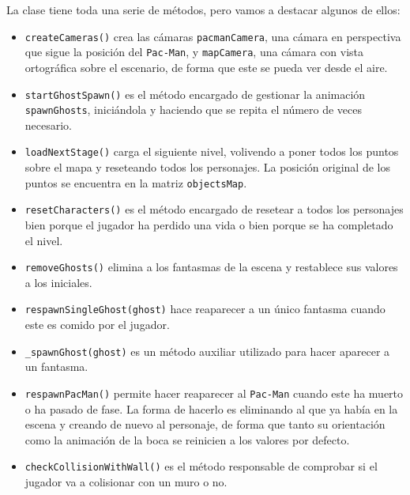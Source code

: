 \documentclass[11pt,a4paper]{article}
\begin{document}
La clase tiene toda una serie de métodos, pero vamos a destacar algunos de ellos:

\begin{itemize}
	\item \texttt{createCameras()} crea las cámaras \texttt{pacmanCamera}, una cámara en
	perspectiva que sigue la posición del \texttt{Pac-Man}, y \texttt{mapCamera}, una cámara
	con vista ortográfica sobre el escenario, de forma que este se pueda ver desde el aire.
	
	\item \texttt{startGhostSpawn()} es el método encargado de gestionar la animación
	\texttt{spawnGhosts}, iniciándola y haciendo que se repita el número de veces necesario.
	
	\item \texttt{loadNextStage()} carga el siguiente nivel, volivendo a poner todos los
	puntos sobre el mapa y reseteando todos los personajes. La posición original de los puntos
	se encuentra en la matriz \texttt{objectsMap}.
	
	\item \texttt{resetCharacters()} es el método encargado de resetear a todos los personajes
	bien porque el jugador ha perdido una vida o bien porque se ha completado el nivel.
	
	\item \texttt{removeGhosts()} elimina a los fantasmas de la escena y restablece sus
	valores a los iniciales.
	
	\item \texttt{respawnSingleGhost(ghost)} hace reaparecer a un único fantasma cuando este
	es comido por el jugador.
	
	\item \texttt{\_spawnGhost(ghost)} es un método auxiliar utilizado para hacer aparecer a un
	fantasma.
	
	\item \texttt{respawnPacMan()} permite hacer reaparecer al \texttt{Pac-Man} cuando este
	ha muerto o ha pasado de fase. La forma de hacerlo es eliminando al que ya había en la
	escena y creando de nuevo al personaje, de forma que tanto su orientación como la animación
	de la boca se reinicien a los valores por defecto.
	
	\item \texttt{checkCollisionWithWall()} es el método responsable de comprobar si el
	jugador va a colisionar con un muro o no.
	

\end{itemize}
\end{document}
